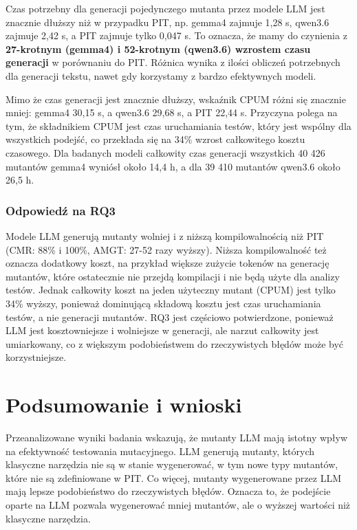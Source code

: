 \documentclass[12pt,a4paper,oldfontcommands]{memoir}
\theoremstyle{plain}
\theoremstyle{definition}
\theoremstyle{remark}
\begin{document}
    Czas potrzebny dla generacji pojedynczego mutanta przez modele LLM jest znacznie dłuższy niż w przypadku PIT, np. gemma4 zajmuje 1,28 s, qwen3.6 zajmuje 2,42 s, a PIT zajmuje tylko 0,047 s.
    To oznacza, że mamy do czynienia z \textbf{27-krotnym (gemma4) i 52-krotnym (qwen3.6) wzrostem czasu generacji} w porównaniu do PIT.
    Różnica wynika z ilości obliczeń potrzebnych dla generacji tekstu, nawet gdy korzystamy z bardzo efektywnych modeli.

    Mimo że czas generacji jest znacznie dłuższy, wskaźnik CPUM różni się znacznie mniej: gemma4 30,15 s, a qwen3.6 29,68 s, a PIT 22,44 s.
    Przyczyna polega na tym, że składnikiem CPUM jest czas uruchamiania testów, który jest wspólny dla wszystkich podejść, co przekłada się na 34\% wzrost całkowitego kosztu czasowego.
    Dla badanych modeli całkowity czas generacji wszystkich 40 426 mutantów gemma4 wyniósł około 14,4 h, a dla 39 410 mutantów qwen3.6 około 26,5 h.

    \subsection{Odpowiedź na RQ3}

    Modele LLM generują mutanty wolniej i z niższą kompilowalnością niż PIT (CMR: 88\% i 100\%, AMGT: 27-52 razy wyższy).
    Niższa kompilowalność też oznacza dodatkowy koszt, na przykład większe zużycie tokenów na generację mutantów, które ostatecznie nie przejdą kompilacji i nie będą użyte dla analizy testów.
    Jednak całkowity koszt na jeden użyteczny mutant (CPUM) jest tylko 34\% wyższy, ponieważ dominującą składową kosztu jest czas uruchamiania testów, a nie generacji mutantów.
    RQ3 jest częściowo potwierdzone, ponieważ LLM jest kosztowniejsze i wolniejsze w generacji, ale narzut całkowity jest umiarkowany, co z większym podobieństwem do rzeczywistych błędów może być korzystniejsze.

    \clearpage
    \openany
    \chapter{Podsumowanie i wnioski}
    \openright

    Przeanalizowane wyniki badania wskazują, że mutanty LLM mają istotny wpływ na efektywność testowania mutacyjnego.
    LLM generują mutanty, których klasyczne narzędzia nie są w stanie wygenerować, w tym nowe typy mutantów, które nie są zdefiniowane w PIT.
    Co więcej, mutanty wygenerowane przez LLM mają lepsze podobieństwo do rzeczywistych błędów.
    Oznacza to, że podejście oparte na LLM pozwala wygenerować mniej mutantów, ale o wyższej wartości niż klasyczne narzędzia.
\end{document}
